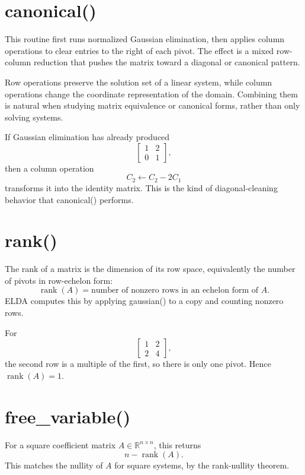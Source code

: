 \documentclass[11pt,a4paper,openany]{book}
\def\code#1{#1}%
\DeclareRobustCommand{\code}[1]{\texttt{\detokenize{#1}}}
\newcommand{\R}{\mathbb{R}}
\DeclareMathOperator{\rankop}{rank}
\begin{document}
\section{\code{canonical()}}
This routine first runs normalized Gaussian elimination, then applies column operations to clear entries to the right of each pivot. The effect is a mixed row-column reduction that pushes the matrix toward a diagonal or canonical pattern.

\begin{mathbox}
Row operations preserve the solution set of a linear system, while column operations change the coordinate representation of the domain. Combining them is natural when studying matrix equivalence or canonical forms, rather than only solving systems.
\end{mathbox}

\begin{examplebox}[Example]
If Gaussian elimination has already produced
\[
\begin{bmatrix}
1 & 2 \\
0 & 1
\end{bmatrix},
\]
then a column operation
\[
C_2 \leftarrow C_2 - 2C_1
\]
transforms it into the identity matrix. This is the kind of diagonal-cleaning behavior that \code{canonical()} performs.
\end{examplebox}

\section{\code{rank()}}
The rank of a matrix is the dimension of its row space, equivalently the number of pivots in row-echelon form:
\[
\rankop(A) = \text{number of nonzero rows in an echelon form of } A.
\]
ELDA computes this by applying \code{gaussian()} to a copy and counting nonzero rows.

\begin{examplebox}[Example]
For
\[
\begin{bmatrix}
1 & 2 \\
2 & 4
\end{bmatrix},
\]
the second row is a multiple of the first, so there is only one pivot. Hence \(\rankop(A)=1\).
\end{examplebox}

\section{\code{free_variable()}}
For a square coefficient matrix \(A \in \R^{n \times n}\), this returns
\[
n - \rankop(A).
\]
This matches the nullity of \(A\) for square systems, by the rank-nullity theorem.
\end{document}
